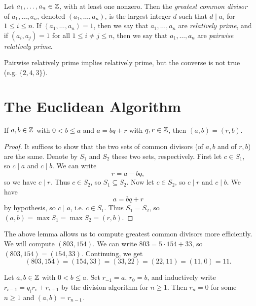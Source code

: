 \begin{definition}
  Let $a_1, \dots, a_n \in \mathbb{Z}$, with at
  least one nonzero. Then the
  \emph{greatest common divisor}
  of $a_1, \dots, a_n$, denoted
  $(a_1, \dots, a_n)$, is the
  largest integer $d$ such that
  $d \mid a_i$ for $1 \le i \le n$.
  If $(a_1, \dots, a_n) = 1$, then we say
  that $a_1, \dots, a_n$ are
  \emph{relatively prime}, and if
  $(a_i, a_j) = 1$ for all $1\le i \ne j \le n$,
  then we say that $a_1, \dots, a_n$
  are \emph{pairwise relatively prime}.
\end{definition}

\begin{remark}
  Pairwise relatively prime implies
  relatively prime, but the converse
  is not true (e.g. $\{2, 4, 3\}$).
\end{remark}

\section{The Euclidean Algorithm}

\begin{lemma}
  If $a, b \in \mathbb{Z}$ with $0 < b \le a$ and
  $a = bq + r$ with $q, r \in \mathbb{Z}$, then
  $(a, b) = (r, b)$.
\end{lemma}

\begin{proof}
  It suffices to show that the two sets of
  common divisors (of $a, b$ and of $r, b$)
  are the same. Denote by $S_1$ and $S_2$
  these two sets, respectively. First let
  $c \in S_1$, so $c \mid a$ and $c \mid b$.
  We can write
  \[
    r = a - bq,
  \]
  so we have $c \mid r$. Thus
  $c \in S_2$, so $S_1 \subseteq S_2$.
  Now let $c \in S_2$, so $c \mid r$ and
  $c \mid b$. We have
  \[
    a = bq + r
  \]
  by hypothesis, so $c \mid a$, i.e.
  $c \in S_1$.
  Thus $S_1 = S_2$, so
  $(a, b) = \max S_1 = \max S_2 = (r, b)$.
\end{proof}

\begin{example}
  The above lemma allows us to compute
  greatest common divisors more efficiently.
  We will compute $(803, 154)$. We
  can write
  $803 = 5 \cdot 154 + 33$, so
  $(803, 154) = (154, 33)$.
  Continuing, we get
  \[
    (803, 154)
    = (154, 33)
    = (33, 22)
    = (22, 11)
    = (11, 0) = 11.
  \]
\end{example}

\begin{theorem}
  Let $a, b \in \mathbb{Z}$ with $0 < b \le a$.
  Set $r_{-1} = a$, $r_0 = b$, and inductively
  write
  $r_{i - 1} = q_i r_i + r_{i + 1}$
  by the division algorithm for
  $n \ge 1$.
  Then $r_n = 0$ for some $n \ge 1$
  and $(a, b) = r_{n - 1}$.
\end{theorem}

